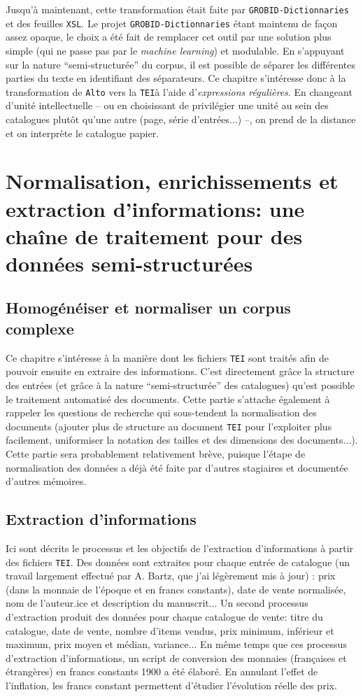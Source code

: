 \documentclass[a4paper, 12pt, twoside]{book}
\newcommand{\alto}{\texttt{Alto}}
\newcommand{\rgx}{\textit{expressions régulières}}
\newcommand{\tei}{\texttt{TEI}}
\newcommand{\xsl}{\texttt{XSL}}
\begin{document}
Jusqu'à maintenant, cette transformation était faite par \texttt{GROBID-Dictionnaries} et des feuilles \xsl{}. Le projet \texttt{GROBID-Dictionnaries} étant maintenu de façon assez opaque, le choix a été fait de remplacer cet outil par une solution plus simple (qui ne passe pas par le \textit{machine learning}) et modulable. En s'appuyant sur la nature \enquote{semi-structurée} du corpus, il est possible de séparer les différentes parties du texte en identifiant des séparateurs. Ce chapitre s'intéresse donc à la transformation de \alto{} vers la \tei{}à l'aide d'\rgx{}. En changeant d'unité intellectuelle -- ou en choisissant de privilégier une unité au sein des catalogues plutôt qu'une autre (page, série d'entrées...) --, on prend de la distance et on interprète le catalogue papier.




\part{Normalisation, enrichissements et extraction d'informations: une chaîne de traitement pour des données semi-structurées}
\chapter{Homogénéiser et normaliser un corpus complexe}
Ce chapitre s'intéresse à la manière dont les fichiers \tei{} sont traités afin de pouvoir ensuite en extraire des informations. C'est directement grâce la structure des entrées (et grâce à la nature \enquote{semi-structurée} des catalogues) qu'est possible le traitement automatisé des documents. Cette partie s'attache également à rappeler les questions de recherche qui sous-tendent la normalisation des documents (ajouter plus de structure au document \tei{} pour l'exploiter plus facilement, uniformiser la notation des tailles et des dimensions des documents...). Cette partie sera probablement relativement brève, puisque l'étape de normalisation des données a déjà été faite par d'autres stagiaires et documentée d'autres mémoires.

\chapter{Extraction d'informations}
Ici sont décrits le processus et les objectifs de l'extraction d'informations à partir des fichiers \tei{}. Des données sont extraites pour chaque entrée de catalogue (un travail largement effectué par A. Bartz, que j'ai légèrement mis à jour) : prix (dans la monnaie de l'époque et en francs constants), date de vente normalisée, nom de l'auteur.ice et description du manuscrit... Un second processus d'extraction produit des données pour chaque catalogue de vente: titre du catalogue, date de vente, nombre d'items vendus, prix minimum, inférieur et maximum, prix moyen et médian, variance... En même temps que ces processus d'extraction d'informations, un script de conversion des monnaies (françaises et étrangères) en francs constants 1900 a été élaboré. En annulant l'effet de l'inflation, les francs constant permettent d'étudier l'évolution réelle des prix.
\end{document}
